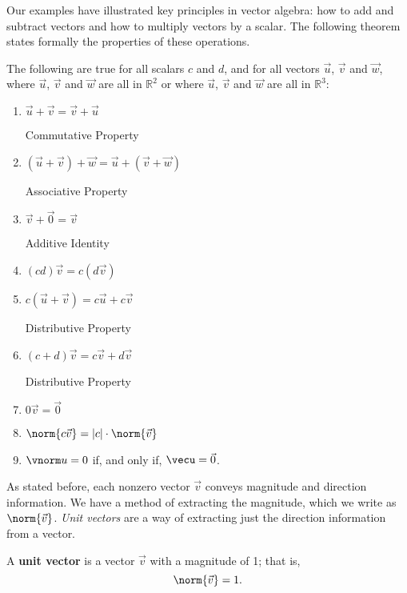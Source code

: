 Our examples have illustrated key principles in vector algebra: how to add and subtract vectors and how to multiply vectors by a scalar. The following theorem states formally the properties of these operations.

{The following are true for all scalars $c$ and $d$, and for all vectors $\vec u$, $\vec v$ and $\vec w$, where $\vec u$, $\vec v$ and $\vec w$ are all in $\mathbb{R}^2$ or where $\vec u$, $\vec v$ and $\vec w$ are all in $\mathbb{R}^3$:
\begin{enumerate}
	\item \parbox{150pt}{$\vec u+\vec v = \vec v+\vec u$}Commutative Property
	\item \parbox{150pt}{$(\vec u+\vec v)+\vec w = \vec u+(\vec v+\vec w)$}Associative Property
	\item \parbox{150pt}{$\vec v+\vec 0 = \vec v$}Additive Identity
	\item \parbox{150pt}{$(cd)\vec v= c(d\vec v)$}
	\item \parbox{150pt}{$c(\vec u+\vec v) = c\vec u+c\vec v$}Distributive Property
	\item \parbox{150pt}{$(c+d)\vec v = c\vec v+d\vec v$}Distributive Property
	\item \parbox{150pt}{$0\vec v = \vec 0$}
	\item	\parbox{150pt}{$\norm{c\vec v} = \lvert c\rvert\cdot\norm{\vec v}$}\label{thm:norm_prop}
	\item	$\vnorm u = 0$ if, and only if, $\vecu = \vec 0$.  \label{thm:zero_norm}
\end{enumerate}
}

%

As stated before, each nonzero vector $\vec v$ conveys magnitude and direction information. We have a method of extracting the magnitude, which we write as $\norm{\vec v}$. \textit{Unit vectors} are a way of extracting just the direction information from a vector.

{A \textbf{unit vector} is a vector $\vec v$ with a magnitude of 1; that is, 
\[
\norm{\vec v}=1.
\]
}

